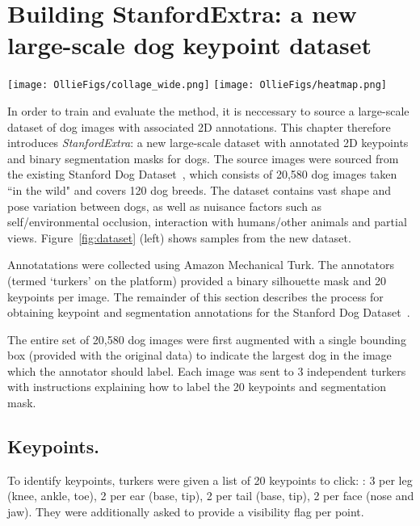 
\section{Building StanfordExtra: a new large-scale dog keypoint dataset}

\begin{figure*}[h]
    \centering
    \texttt{[image: OllieFigs/collage\_wide.png]}
    \texttt{[image: OllieFigs/heatmap.png]}
    \caption{\textbf{StanfordExtra example images}. \emph{Left}: outlined segmentations and labelled keypoints for 24 representative images. \emph{Right}: heatmap of deviation of worker submitted results from mean for each submission.}
    \label{fig:dataset}
\end{figure*}

In order to train and evaluate the method, it is neccessary to source a large-scale dataset of dog images with associated 2D annotations. This chapter therefore introduces \emph{StanfordExtra}: a new large-scale dataset with annotated 2D keypoints and binary segmentation masks for dogs. The source images were sourced from the existing Stanford Dog Dataset~\cite{StanfordDogs}, which consists of 20,580 dog images taken ``in the wild" and covers 120 dog breeds. The dataset contains vast shape and pose variation between dogs, as well as nuisance factors such as self/environmental occlusion, interaction with humans/other animals and partial views. Figure~\ref{fig:dataset} (left) shows samples from the new dataset.

Annotatations were collected using Amazon Mechanical Turk. The annotators (termed `turkers' on the platform) provided a binary silhouette mask and 20 keypoints per image. The remainder of this section describes the process for obtaining keypoint and segmentation annotations for the Stanford Dog Dataset~\cite{StanfordDogs}. 

The entire set of 20,580 dog images were first augmented with a single bounding box (provided with the original data) to indicate the largest dog in the image which the annotator should label. Each image was sent to 3 independent turkers with instructions explaining how to label the 20 keypoints and segmentation mask. 

\subsection{Keypoints.} 
To identify keypoints, turkers were given a list of 20 keypoints to click: : 3 per leg (knee, ankle, toe), 2 per ear (base, tip), 2 per tail (base, tip), 2 per face (nose and jaw). They were additionally asked to provide a visibility flag per point. 

